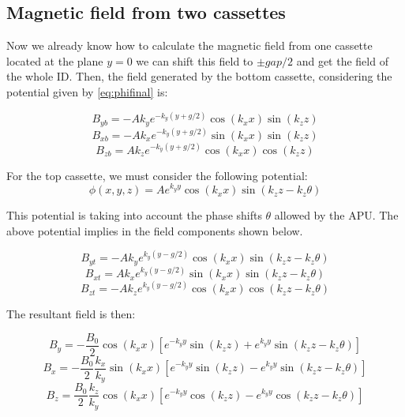 \documentclass{article}
\begin{document}
\subsection{Magnetic field from two cassettes}
Now we already know how to calculate the magnetic field from one cassette located at the plane $y=0$ we can shift this field to $\pm gap/2$ and get the field of the whole ID. Then, the field generated  by the bottom cassette, considering the potential given by \ref{eq:phifinal} is:

\begin{equation}
B_{yb} = -Ak_ye^{-k_y\left(y + g/2\right)}\cos(k_xx)\sin(k_zz)
\end{equation}
\begin{equation}
B_{xb} = -Ak_xe^{-k_y\left(y + g/2\right)}\sin(k_xx)\sin(k_zz)
\end{equation}
\begin{equation}
B_{zb} = Ak_ze^{-k_y\left(y + g/2\right)}\cos(k_xx)\cos(k_zz)
\end{equation}

For the top cassette, we must consider the following potential:
\begin{equation}
\phi(x, y, z) = Ae^{k_yy}\cos{\left(k_xx\right)}\sin{\left(k_zz -k_z\theta\right)}
\label{eq:phitop}
\end{equation}

This potential is taking into account the phase shifts $\theta$ allowed by the APU. The above potential implies in the field components shown below.

\begin{equation}
B_{yt} = -Ak_ye^{k_y\left(y - g/2\right)}\cos(k_xx)\sin(k_zz-k_z\theta)
\end{equation}
\begin{equation}
B_{xt} = Ak_xe^{k_y\left(y - g/2\right)}\sin(k_xx)\sin(k_zz-k_z\theta)
\end{equation}
\begin{equation}
B_{zt} = -Ak_ze^{k_y\left(y - g/2\right)}\cos(k_xx)\cos(k_zz-k_z\theta)
\end{equation}

The resultant field is then:

\begin{equation}
B_{y} = -\frac{B_0}{2}\cos(k_xx)\left[e^{-k_yy}\sin(k_zz) + e^{k_yy}\sin(k_zz -k_z\theta)\right]
\label{eq:by}
\end{equation}
\begin{equation}
B_{x} = -\frac{B_0}{2}\frac{k_x}{k_y}\sin(k_xx)\left[e^{-k_yy}\sin(k_zz) - e^{k_yy}\sin(k_zz -k_z\theta)\right]
\label{eq:bx}
\end{equation}
\begin{equation}
B_{z} = \frac{B_0}{2}\frac{k_z}{k_y}\cos(k_xx)\left[e^{-k_yy}\cos(k_zz) - e^{k_yy}\cos(k_zz -k_z\theta)\right]
\end{equation}
\end{document}
